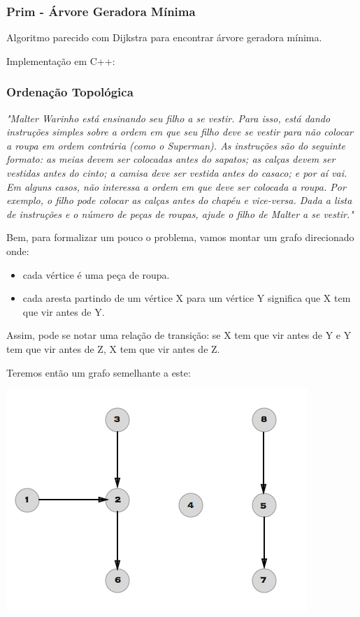 \documentclass[a4paper,12pt]{article}
\begin{document}
\subsubsection{Prim - Árvore Geradora Mínima}

Algoritmo parecido com Dijkstra para encontrar árvore geradora mínima.

\noindent Implementação em C++:

\subsubsection{Ordenação Topológica}

\textit{"Malter Warinho está ensinando seu filho a se vestir. Para isso, está dando instruções simples sobre a ordem em que seu filho deve se vestir para não colocar a roupa em ordem contrária (como o Superman). As instruções são do seguinte formato: as meias devem ser colocadas antes do sapatos; as calças devem ser vestidas antes do cinto; a camisa deve ser vestida antes do casaco; e por aí vai. Em alguns casos, não interessa a ordem em que deve ser colocada a roupa. Por exemplo, o filho pode colocar as calças antes do chapéu e vice-versa. Dada a lista de instruções e o número de peças de roupas, ajude o filho de Malter a se vestir."}\newline

\noindent Bem, para formalizar um pouco o problema, vamos montar um grafo direcionado onde:

\begin{itemize}
    \item cada vértice é uma peça de roupa.
    \item cada aresta partindo de um vértice X para um vértice Y significa que X tem que vir antes de Y.
\end{itemize}

\noindent Assim, pode se notar uma relação de transição: se X tem que vir antes de Y e Y tem que vir antes de Z, X tem que vir antes de Z.

\noindent Teremos então um grafo semelhante a este:

\begin{center}
  \includegraphics[width=\linewidth/2]{figures/grafos/OT.png}
\end{center}
\end{document}
